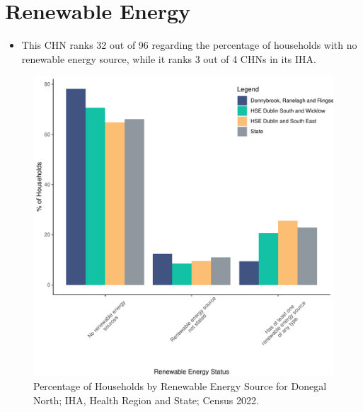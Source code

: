 \documentclass{article}
\begin{document}
\section{Renewable Energy}\label{sect:RE}
\begin{itemize}
\item This CHN ranks  32 out of 96 regarding the percentage of households with no renewable energy source, while it ranks   3 out of 4 CHNs in its IHA.
\end{itemize}
\begin{figure}[H]
	\centering
	\includegraphics[width = 140mm]{../figures/RenewableEnergyED.pdf}
	\caption{Percentage of Households by Renewable Energy Source for Donegal North; IHA, Health Region and State; Census 2022.}
	\label{fig:vbnv}
	\end{figure}
\end{document}
